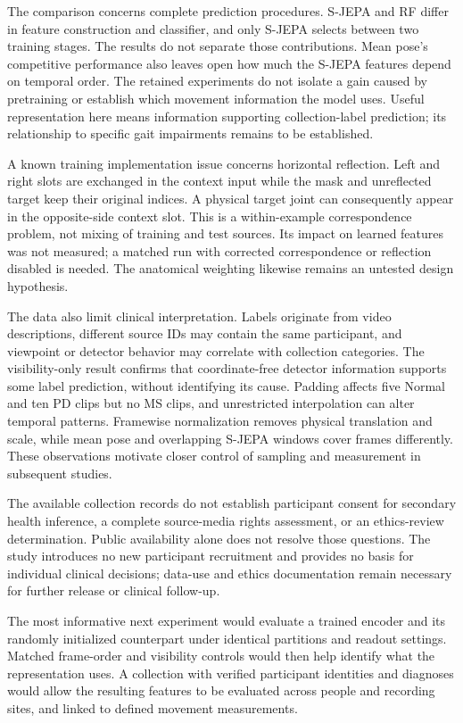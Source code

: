 \documentclass[10pt,twocolumn,letterpaper]{article}
\begin{document}
The comparison concerns complete prediction procedures. S-JEPA and RF differ in feature construction and classifier, and only S-JEPA selects between two training stages. The results do not separate those contributions. Mean pose's competitive performance also leaves open how much the S-JEPA features depend on temporal order. The retained experiments do not isolate a gain caused by pretraining or establish which movement information the model uses. Useful representation here means information supporting collection-label prediction; its relationship to specific gait impairments remains to be established.

A known training implementation issue concerns horizontal reflection. Left and right slots are exchanged in the context input while the mask and unreflected target keep their original indices. A physical target joint can consequently appear in the opposite-side context slot. This is a within-example correspondence problem, not mixing of training and test sources. Its impact on learned features was not measured; a matched run with corrected correspondence or reflection disabled is needed. The anatomical weighting likewise remains an untested design hypothesis.

The data also limit clinical interpretation. Labels originate from video descriptions, different source IDs may contain the same participant, and viewpoint or detector behavior may correlate with collection categories. The visibility-only result confirms that coordinate-free detector information supports some label prediction, without identifying its cause. Padding affects five Normal and ten PD clips but no MS clips, and unrestricted interpolation can alter temporal patterns. Framewise normalization removes physical translation and scale, while mean pose and overlapping S-JEPA windows cover frames differently. These observations motivate closer control of sampling and measurement in subsequent studies.

The available collection records do not establish participant consent for secondary health inference, a complete source-media rights assessment, or an ethics-review determination. Public availability alone does not resolve those questions. The study introduces no new participant recruitment and provides no basis for individual clinical decisions; data-use and ethics documentation remain necessary for further release or clinical follow-up.

The most informative next experiment would evaluate a trained encoder and its randomly initialized counterpart under identical partitions and readout settings. Matched frame-order and visibility controls would then help identify what the representation uses. A collection with verified participant identities and diagnoses would allow the resulting features to be evaluated across people and recording sites, and linked to defined movement measurements.
\end{document}
